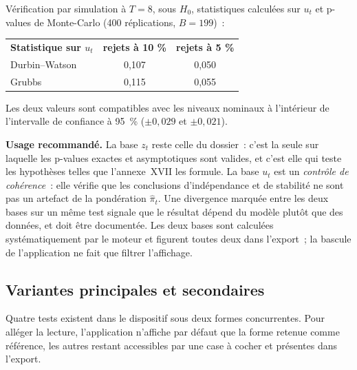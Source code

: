 \documentclass[a4paper,11pt]{article}
\begin{document}
Vérification par simulation à $T = 8$, sous $H_0$, statistiques calculées sur
$u_t$ et p-values de Monte-Carlo (400 réplications, $B = 199$)~:

\begin{center}
\small
{}
\begin{tabular}{@{}p{5.0cm}cc@{}}
\rowcolor{tableheader}
\textcolor{financeblue}{\textbf{Statistique sur $u_t$}} &
\textcolor{financeblue}{\textbf{rejets à 10 \%}} &
\textcolor{financeblue}{\textbf{rejets à 5 \%}} \\
Durbin--Watson & 0,107 & 0,050 \\
Grubbs         & 0,115 & 0,055 \\
\end{tabular}
\end{center}

\noindent
Les deux valeurs sont compatibles avec les niveaux nominaux à l'intérieur de
l'intervalle de confiance à 95~\% ($\pm 0{,}029$ et $\pm 0{,}021$).

\medskip
\begin{encadre}
\textbf{Usage recommandé.} La base $z_t$ reste celle du dossier~: c'est la seule
sur laquelle les p-values exactes et asymptotiques sont valides, et c'est elle
qui teste les hypothèses telles que l'annexe~XVII les formule. La base $u_t$ est
un \emph{contrôle de cohérence}~: elle vérifie que les conclusions
d'indépendance et de stabilité ne sont pas un artefact de la pondération
$\hat\pi_t$. Une divergence marquée entre les deux bases sur un même test
signale que le résultat dépend du modèle plutôt que des données, et doit être
documentée. Les deux bases sont calculées systématiquement par le moteur et
figurent toutes deux dans l'export~; la bascule de l'application ne fait que
filtrer l'affichage.
\end{encadre}

\subsection{Variantes principales et secondaires}
\label{sec:variantes}

Quatre tests existent dans le dispositif sous deux formes concurrentes. Pour
alléger la lecture, l'application n'affiche par défaut que la forme retenue
comme référence, les autres restant accessibles par une case à cocher et
présentes dans l'export.
\end{document}
